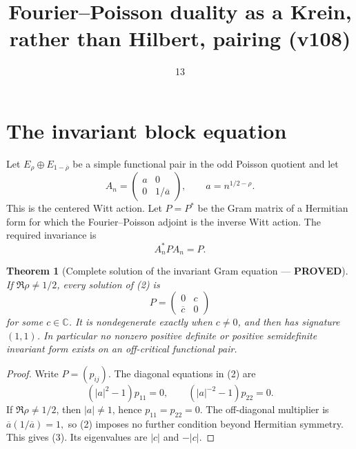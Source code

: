 \documentclass[11pt]{article}
\title{Fourier--Poisson duality as a Krein, rather than Hilbert, pairing (v108)}
\date{13}
\newcommand{\PROVED}{\textcolor{green!40!black}{\textbf{PROVED}}}
\newtheorem{theorem}{Theorem}
\begin{document}
\maketitle

\section{The invariant block equation}

Let $E_\rho\oplus E_{1-\overline\rho}$ be a simple functional pair in the
odd Poisson quotient and let
\begin{equation}
 A_n=\begin{pmatrix}a&0\\0&1/\overline a\end{pmatrix},
 \qquad a=n^{1/2-\rho}.                                    \tag{1}
\end{equation}
This is the centered Witt action.  Let $P=P^*$ be the Gram matrix of a
Hermitian form for which the Fourier--Poisson adjoint is the inverse Witt
action.  The required invariance is
\begin{equation}
                         A_n^*PA_n=P.                         \tag{2}
\end{equation}

\begin{theorem}[Complete solution of the invariant Gram equation ---
\PROVED]
If $\Re\rho\ne1/2$, every solution of (2) is
\begin{equation}
                         P=\begin{pmatrix}0&c\\\overline c&0\end{pmatrix}
                                                               \tag{3}
\end{equation}
for some $c\in\mathbb C$.  It is nondegenerate exactly when $c\ne0$, and
then has signature $(1,1)$.  In particular no nonzero positive definite or
positive semidefinite invariant form exists on an off-critical functional
pair.
\end{theorem}

\begin{proof}
Write $P=(p_{ij})$.  The diagonal equations in (2) are
\[
 (|a|^2-1)p_{11}=0,
 \qquad (|a|^{-2}-1)p_{22}=0.
\]
If $\Re\rho\ne1/2$, then $|a|\ne1$, hence $p_{11}=p_{22}=0$.  The
off-diagonal multiplier is
\(
 \overline a(1/\overline a)=1,
\)
so (2) imposes no further condition beyond Hermitian symmetry.  This gives
(3).  Its eigenvalues are $|c|$ and $-|c|$.
\end{proof}
\end{document}
